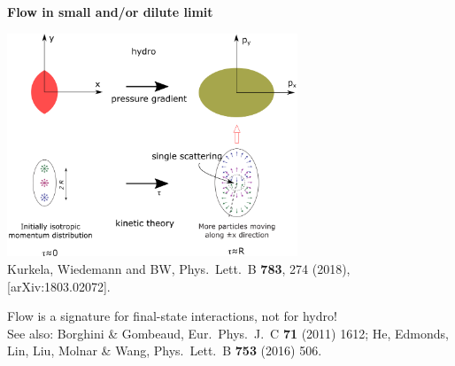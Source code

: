 \documentclass[9pt,a4paper,unknownkeysallowed,xcolor=dvipsnames,aspectratio=43]{beamer}
\begin{document}
\begin{frame}{\bf\huge Flow in small and/or dilute limit}
\vspace{4mm}
\begin{center}
\includegraphics[width=0.65\textwidth]{fig/onehit}\\
{\tiny  {\color{teablue} Kurkela, Wiedemann and BW,
  Phys.\ Lett.\ B {\bf 783}, 274 (2018), [arXiv:1803.02072].
  }
  }
\end{center}
\vspace{4mm}
{{\LARGE\color{darkred} Flow is a signature for final-state interactions, not for hydro!}}
\vspace{2mm}\\
{\tiny  See also: {\color{teablue}   Borghini \& Gombeaud,
  Eur.\ Phys.\ J.\ C {\bf 71} (2011) 1612; He, Edmonds, Lin, Liu, Molnar \& Wang,
  Phys.\ Lett.\ B {\bf 753} (2016) 506.
  }
}
\end{frame}
%
%
%
\end{document}
